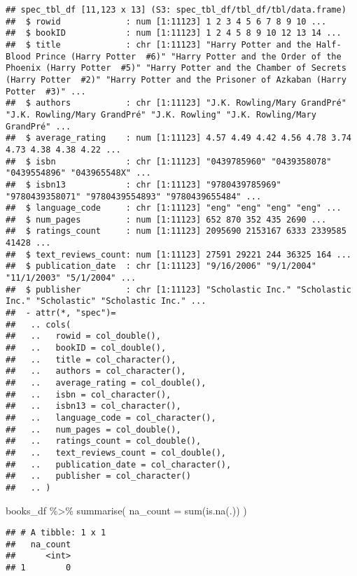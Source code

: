 \documentclass[
]{article}
\newenvironment{Shaded}{\begin{snugshade}}{\end{snugshade}}
\newcommand{\AttributeTok}[1]{\textcolor[rgb]{0.77,0.63,0.00}{#1}}
\newcommand{\FunctionTok}[1]{\textcolor[rgb]{0.00,0.00,0.00}{#1}}
\newcommand{\NormalTok}[1]{#1}
\newcommand{\SpecialCharTok}[1]{\textcolor[rgb]{0.00,0.00,0.00}{#1}}
\begin{document}
\begin{verbatim}
## spec_tbl_df [11,123 x 13] (S3: spec_tbl_df/tbl_df/tbl/data.frame)
##  $ rowid             : num [1:11123] 1 2 3 4 5 6 7 8 9 10 ...
##  $ bookID            : num [1:11123] 1 2 4 5 8 9 10 12 13 14 ...
##  $ title             : chr [1:11123] "Harry Potter and the Half-Blood Prince (Harry Potter  #6)" "Harry Potter and the Order of the Phoenix (Harry Potter  #5)" "Harry Potter and the Chamber of Secrets (Harry Potter  #2)" "Harry Potter and the Prisoner of Azkaban (Harry Potter  #3)" ...
##  $ authors           : chr [1:11123] "J.K. Rowling/Mary GrandPré" "J.K. Rowling/Mary GrandPré" "J.K. Rowling" "J.K. Rowling/Mary GrandPré" ...
##  $ average_rating    : num [1:11123] 4.57 4.49 4.42 4.56 4.78 3.74 4.73 4.38 4.38 4.22 ...
##  $ isbn              : chr [1:11123] "0439785960" "0439358078" "0439554896" "043965548X" ...
##  $ isbn13            : chr [1:11123] "9780439785969" "9780439358071" "9780439554893" "9780439655484" ...
##  $ language_code     : chr [1:11123] "eng" "eng" "eng" "eng" ...
##  $ num_pages         : num [1:11123] 652 870 352 435 2690 ...
##  $ ratings_count     : num [1:11123] 2095690 2153167 6333 2339585 41428 ...
##  $ text_reviews_count: num [1:11123] 27591 29221 244 36325 164 ...
##  $ publication_date  : chr [1:11123] "9/16/2006" "9/1/2004" "11/1/2003" "5/1/2004" ...
##  $ publisher         : chr [1:11123] "Scholastic Inc." "Scholastic Inc." "Scholastic" "Scholastic Inc." ...
##  - attr(*, "spec")=
##   .. cols(
##   ..   rowid = col_double(),
##   ..   bookID = col_double(),
##   ..   title = col_character(),
##   ..   authors = col_character(),
##   ..   average_rating = col_double(),
##   ..   isbn = col_character(),
##   ..   isbn13 = col_character(),
##   ..   language_code = col_character(),
##   ..   num_pages = col_double(),
##   ..   ratings_count = col_double(),
##   ..   text_reviews_count = col_double(),
##   ..   publication_date = col_character(),
##   ..   publisher = col_character()
##   .. )
\end{verbatim}

\begin{Shaded}
\begin{Highlighting}[]
\NormalTok{books\_df }\SpecialCharTok{\%\textgreater{}\%} 
  \FunctionTok{summarise}\NormalTok{(}
    \AttributeTok{na\_count =} \FunctionTok{sum}\NormalTok{(}\FunctionTok{is.na}\NormalTok{(.))}
\NormalTok{    )}
\end{Highlighting}
\end{Shaded}

\begin{verbatim}
## # A tibble: 1 x 1
##   na_count
##      <int>
## 1        0
\end{verbatim}
\end{document}
